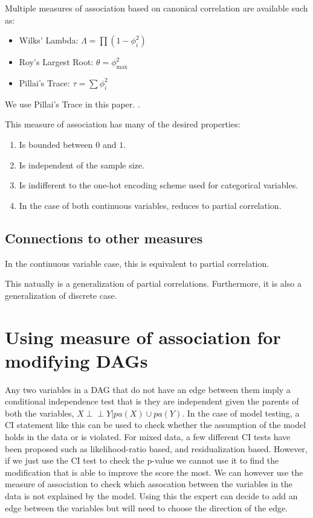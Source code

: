 \documentclass[letterpaper]{article} %
\def\ci{\perp\!\!\!\!\!\perp}
\begin{document}
Multiple measures of association based on canonical correlation are available such as:
\begin{itemize}
	\item Wilks' Lambda: $ \Lambda = \prod (1 - \phi_i^2) $
	\item Roy's Largest Root: $ \theta = \phi_{\max}^2 $
	\item Pillai's Trace: $ \tau = \sum \phi_i^2 $
\end{itemize}

We use Pillai's Trace in this paper. .

This measure of association has many of the desired properties:

\begin{enumerate}
	\item Is bounded between $ 0 $ and $ 1 $.
	\item Is independent of the sample size.
	\item Is indifferent to the one-hot encoding scheme used for categorical variables.
	\item In the case of both continuous variables, reduces to partial correlation.
\end{enumerate}

\subsection{Connections to other measures}
In the continuous variable case, this is equivalent to partial correlation.

This natually is a generalization of partial correlations. Furthermore, it is 
also a generalization of discrete case.

\section{Using measure of association for modifying DAGs}
\label{sec:modification}

Any two variables in a DAG that do not have an edge between them imply a
conditional independence test that is they are independent given the parents of
both the variables, $ X \ci Y | pa(X) \cup pa(Y) $. In the case of model
testing, a CI statement like this can be used to check whether the assumption
of the model holds in the data or is violated. For mixed data, a few different
CI tests have been proposed such as likelihood-ratio based, and residualization
based. However, if we just use the CI test to check the p-value we cannot use
it to find the modification that is able to improve the score the most. We can
however use the measure of association to check which assocation between the
variables in the data is not explained by the model. Using this the expert can
decide to add an edge between the variables but will need to choose the
direction of the edge.
\end{document}
